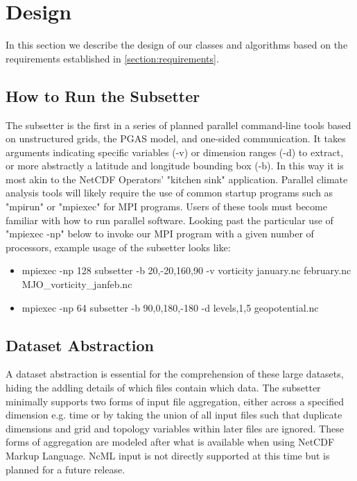 \section{Design}
\label{section:design}

In this section we describe the design of our classes and algorithms based on
the requirements established in \ref{section:requirements}.

\subsection{How to Run the Subsetter}

The subsetter is the first in a series of planned parallel command-line tools
based on unstructured grids, the PGAS model, and one-sided communication.  It
takes arguments indicating specific variables (-v) or dimension ranges (-d) to
extract, or more abstractly a latitude and longitude bounding box (-b).  In
this way it is most akin to the NetCDF Operators' "kitchen sink"
application\cite{NCO}.  Parallel climate analysis tools will likely require
the use of common startup programs such as "mpirun" or "mpiexec" for MPI
programs.  Users of these tools must become familiar with how to run parallel
software.  Looking past the particular use of "mpiexec -np" below to invoke
our MPI program with a given number of processors, example usage of the
subsetter looks like:

\begin{itemize}
\item mpiexec -np 128 subsetter -b 20,-20,160,90 -v vorticity january.nc february.nc MJO\_vorticity\_janfeb.nc
\item mpiexec -np 64 subsetter -b 90,0,180,-180 -d levels,1,5 geopotential.nc
\end{itemize}

\subsection{Dataset Abstraction}

A dataset abstraction is essential for the comprehension of these large
datasets, hiding the addling details of which files contain which data.  The
subsetter minimally supports two forms of input file aggregation, either
across a specified dimension e.g. time or by taking the union of all input
files such that duplicate dimensions and grid and topology variables within
later files are ignored.  These forms of aggregation are modeled after what is
available when using NetCDF Markup Language\cite{NcML}.  NcML input is not
directly supported at this time but is planned for a future release. 

